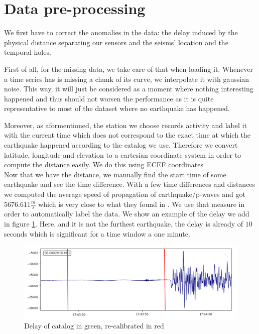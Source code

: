 \documentclass[10pt,conference,compsocconf]{IEEEtran}
\begin{document}
\section{Data pre-processing}
We first have to correct the anomalies in the data: the delay induced by the physical distance separating our sensors and the seisms' location and the temporal holes.\newline

First of all, for the missing data, we take care of that when loading it. Whenever a time series has is missing a chunk of its curve, we interpolate it with gaussian noise. This way, it will just be considered as a moment where nothing interesting happened and thus should not worsen the performance as it is quite representative to most of the dataset where no earthquake has happened.

Moreover, as aformentioned, the station we choose records activity and label it with the current time which does not correspond to the exact time at which the earthquake happened according to the catalog we use. Therefore we convert latitude, longitude and elevation to a cartesian coordinate system in order to compute the distance easily. We do this using ECEF coordinates\cite{ECEFPaper}\\
Now that we have the distance, we manually find the start time of some earthquake and see the time difference. With a few time differences and distances we computed the average speed of propagation of earthquake/p-waves and got $5676.611\frac{m}{s}$ which is very close to what they found in \cite{PWavePaper}. We use that measure in order to automatically label the data. We show an example of the delay we add in figure \ref{fig:timediff}. Here, and it is not the furthest earthquake, the delay is already of $10$ seconds which is significant for a time window a one minute.

\begin{figure}[h]
  \centering
	\includegraphics[width=\columnwidth]{time-diff.png}
  \caption{Delay of catalog in green, re-calibrated in red}
	\label{fig:timediff}
\end{figure}
\end{document}
